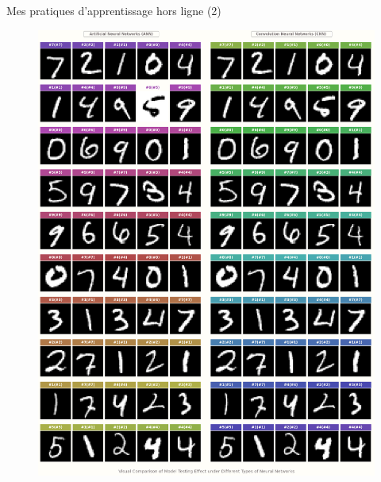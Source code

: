 \documentclass{beamer}
\begin{document}
	\begin{frame}[fragile]{Mes pratiques d'apprentissage hors ligne (2)}
		\begin{figure}[!htb]
			\centering\includegraphics[width=\linewidth]{images/deep_learning_1.png}
			\endminipage\hfill

\end{figure}
\end{frame}
\end{document}
